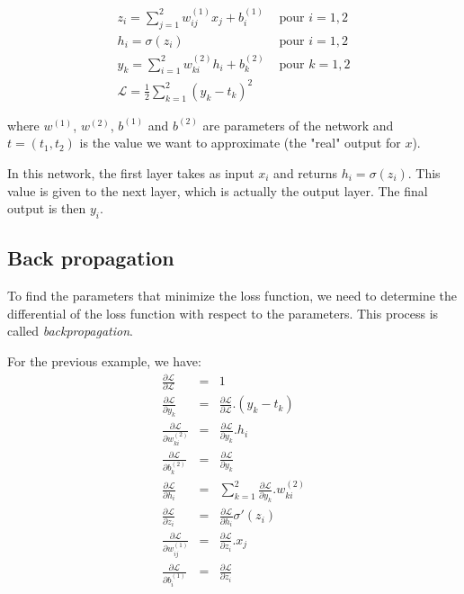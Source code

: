 \documentclass[10pt,a4paper]{article}
\theoremstyle{definition}
\theoremstyle{definition}
\theoremstyle{definition}
\begin{document}
\begin{eqnarray*}
z_i = \sum_{j=1}^2 w_{ij}^{(1)}x_j + b_i^{(1)} & \text{ pour } i = 1,2 \\ 
h_i = \sigma (z_i) & \text{ pour } i=1,2 \\
y_k = \sum_{i=1}^2 w_{ki}^{(2)}h_i + b_k^{(2)} & \text{ pour } k = 1,2 \\
\mathcal{L} = \frac{1}{2} \sum_{k = 1}^2 (y_k - t_k)^2
\end{eqnarray*}
   
where $w^{(1)}$, $w^{(2)}$, $b^{(1)}$ and $b^{(2)}$ are parameters of the network and $t = (t_1, t_2)$ is the value we want to approximate (the "real" output for $x$). 

In this network, the first layer takes as input $x_i$ and returns $h_i = \sigma(z_i)$. This value is given to the next layer, which is actually the output layer. The final output is then $y_i$.

\subsection{Back propagation}
To find the parameters that minimize the loss function, we need to determine the differential of the loss function with respect to the parameters. This process is called \textit{backpropagation}.

For the previous example, we have:
\begin{eqnarray*}
\frac{\partial \mathcal{L}}{\partial \mathcal{L}} & = & 1 \\
\frac{\partial \mathcal{L}}{\partial y_k} & = & \frac{\partial \mathcal{L}}{\partial \mathcal{L}} . (y_k - t_k) \\
\frac{\partial \mathcal{L}}{\partial w_{ki}^{(2)}} & = & \frac{\partial \mathcal{L}}{\partial y_k} . h_i \\
\frac{\partial \mathcal{L}}{\partial b_k^{(2)}} & = & \frac{\partial \mathcal{L}}{\partial y_k} \\
\frac{\partial \mathcal{L}}{\partial h_i} & = & \sum_{k = 1}^2 \frac{\partial \mathcal{L}}{\partial y_k} . w_{ki}^{(2)} \\
\frac{\partial \mathcal{L}}{\partial z_i} & = & \frac{\partial \mathcal{L}}{\partial h_i} \sigma '(z_i) \\
\frac{\partial \mathcal{L}}{\partial w_{ij}^{(1)}} & = & \frac{\partial \mathcal{L}}{\partial z_i} . x_j \\
\frac{\partial \mathcal{L}}{\partial b_i^{(1)}} & = & \frac{\partial \mathcal{L}}{\partial z_i} \\
\end{eqnarray*}
\end{document}
